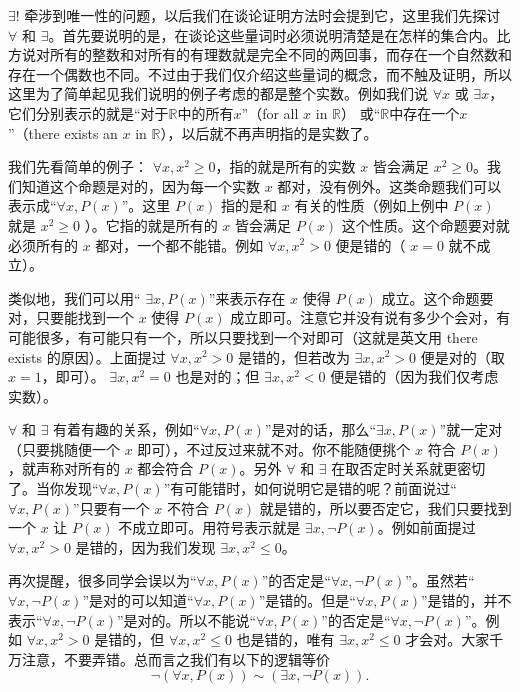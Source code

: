 \(\exists !\) 牵涉到唯一性的问题，以后我们在谈论证明方法时会提到它，这里我们先探讨 \(\forall\) 和 \(\exists\)。首先要说明的是，在谈论这些量词时必须说明清楚是在怎样的集合内。比方说对所有的整数和对所有的有理数就是完全不同的两回事，而存在一个自然数和存在一个偶数也不同。不过由于我们仅介绍这些量词的概念，而不触及证明，所以这里为了简单起见我们说明的例子考虑的都是整个实数。例如我们说 \(\forall x\) 或 \(\exists x\)，它们分别表示的就是“对于$\mathbb{R}$中的所有$x$”（for all \(x\) in \(\mathbb{R}\)） 或“\(\mathbb{R}\)中存在一个$x$”（there exists an \(x\) in \(\mathbb{R}\)），以后就不再声明指的是实数了。

我们先看简单的例子： \(\forall x, x^2 \ge 0\)，指的就是所有的实数 \(x\) 皆会满足 \(x^2 \ge 0\)。我们知道这个命题是对的，因为每一个实数 \(x\) 都对，没有例外。这类命题我们可以表示成“\(\forall x, P(x)\)”。这里 \(P(x)\) 指的是和 \(x\) 有关的性质（例如上例中 \(P(x)\) 就是 \(x^2 \ge 0\) ）。它指的就是所有的 \(x\) 皆会满足 \(P(x)\) 这个性质。这个命题要对就必须所有的 \(x\) 都对，一个都不能错。例如 \(\forall x, x^2 > 0\) 便是错的（ \(x = 0\) 就不成立）。

类似地，我们可以用“ \(\exists x, P(x)\)”来表示存在 \(x\) 使得 \(P(x)\) 成立。这个命题要对，只要能找到一个 \(x\) 使得 \(P(x)\) 成立即可。注意它并没有说有多少个会对，有可能很多，有可能只有一个，所以只要找到一个对即可（这就是英文用 there exists 的原因）。上面提过 \(\forall x, x^2 > 0\) 是错的，但若改为 \(\exists x, x^2 > 0\) 便是对的（取 \(x = 1\)，即可）。 \(\exists x, x^2 = 0\) 也是对的；但 \(\exists x, x^2 < 0\) 便是错的（因为我们仅考虑实数）。

\(\forall\) 和 \(\exists\) 有着有趣的关系，例如“\(\forall x, P(x)\)”是对的话，那么“\(\exists x, P(x)\)”就一定对（只要挑随便一个 \(x\) 即可），不过反过来就不对。你不能随便挑个 \(x\) 符合 \(P(x)\)，就声称对所有的 \(x\) 都会符合 \(P(x)\)。另外 \(\forall\) 和 \(\exists\) 在取否定时关系就更密切了。当你发现“\(\forall x, P(x)\)”有可能错时，如何说明它是错的呢？前面说过“\(\forall x, P(x)\)”只要有一个 \(x\) 不符合 \(P(x)\) 就是错的，所以要否定它，我们只要找到一个 \(x\) 让 \(P(x)\) 不成立即可。用符号表示就是 \(\exists x, \neg P(x)\)。例如前面提过 \(\forall x, x^2 > 0\) 是错的，因为我们发现 \(\exists x, x^2 \le 0\)。

再次提醒，很多同学会误以为“\(\forall x, P(x)\)”的否定是“\(\forall x, \neg P(x)\)”。虽然若“\(\forall x, \neg P(x)\)”是对的可以知道“\(\forall x, P(x)\)”是错的。但是“\(\forall x, P(x)\)”是错的，并不表示“\(\forall x, \neg P(x)\)”是对的。所以不能说“\(\forall x, P(x)\)”的否定是“\(\forall x, \neg P(x)\)”。例如 \(\forall x, x^2 > 0\) 是错的，但 \(\forall x, x^2 \le 0\) 也是错的，唯有 \(\exists x, x^2 \le 0\) 才会对。大家千万注意，不要弄错。总而言之我们有以下的逻辑等价
\[
\neg(\forall x,P(x)) \sim (\exists x,\neg P(x)). \tag{1.15}
\]

